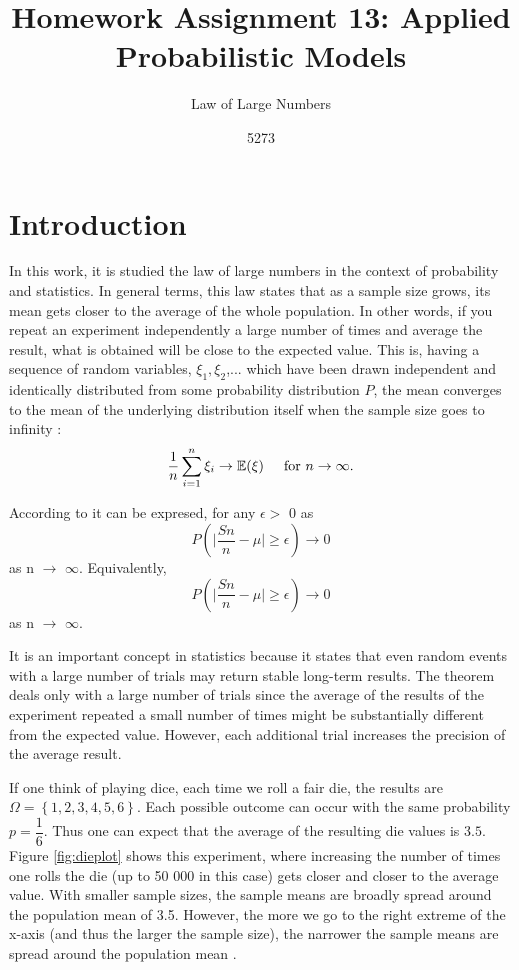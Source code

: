 \documentclass[10pt,leter,openany]{article}
\author{5273}
\title{Homework Assignment 13: Applied Probabilistic Models}
\subtitle{Law of Large Numbers}
\date{}
\begin{document}
	
\maketitle

\section{Introduction}

In this work, it is studied the law of large numbers in the context of probability and statistics. In general terms, this law states that as a sample size grows, its mean gets closer to the average of the whole population. In other words, if you repeat an experiment independently a large number of times and average the result, what is obtained will be close to the expected value. This is, having a sequence of random variables, $\xi_{1}, \xi_{2}$,... which have been drawn independent and identically distributed from some probability distribution $P$, the mean converges to the mean of the underlying distribution itself when the sample size goes to infinity \citep{LUXBURG2011651}: \begin{equation}
	\frac{1}{n} \displaystyle\sum_{i=1}^{n} \xi_{i} \rightarrow \mathbb{E}(\xi)  \hspace{5mm} \mbox {for } n \rightarrow \infty.
\end{equation}

According to \citet{grinstead2012introduction} it can be expresed, for any $\epsilon >$ 0 as \begin{equation}
	P\left(   \Big\lvert \dfrac{Sn}{n} - \mu \Big\rvert   \geq \epsilon \right)  \rightarrow 0
\end{equation}  as n $\rightarrow$ $\infty$. Equivalently, \begin{equation}
P\left(   \Big\lvert \dfrac{Sn}{n} - \mu \Big\rvert   \geq \epsilon \right)  \rightarrow 0
\end{equation} as n $\rightarrow$ $\infty$.

It is an important concept in statistics because it states that even random events with a large number of trials may return stable long-term results. The theorem deals only with a large number of trials since the average of the results of the experiment repeated a small number of times might be substantially different from the expected value. However, each additional trial increases the precision of the average result.

If one think of playing dice, each time we roll a fair die, the results are $\Omega = \left\lbrace 1, 2, 3, 4, 5, 6\right\rbrace $. Each possible outcome can occur with the same probability $p=\dfrac{1}{6}$. Thus one can expect that the average of the resulting die values is $ 3.5 $. Figure \ref{fig:dieplot} shows this experiment, where increasing the number of times one rolls the die (up to 50 000 in this case) gets closer and closer to the average value. With smaller sample sizes, the sample means are broadly spread around the population mean of 3.5. However, the more we go to the right extreme of the x-axis (and thus the larger the sample size), the narrower the sample means are spread around the population mean \citep{matter2017}.
\end{document}
